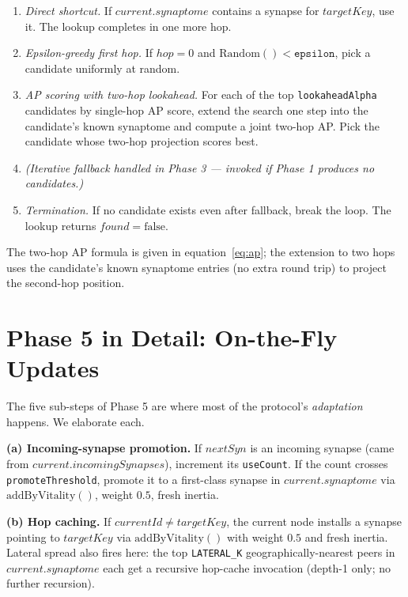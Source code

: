 \documentclass[twoside,nobib]{tufte-book}
\begin{document}
\begin{enumerate}\setlength\itemsep{0.15em}
  \item \emph{Direct shortcut.} If
    $\mathit{current}.\mathit{synaptome}$ contains a synapse for
    $\mathit{targetKey}$, use it. The lookup completes in one more
    hop.
  \item \emph{Epsilon-greedy first hop.} If $\mathit{hop} = 0$ and
    $\mathrm{Random}() < \texttt{epsilon}$, pick a candidate
    uniformly at random.
  \item \emph{AP scoring with two-hop lookahead.} For each of the
    top \texttt{lookaheadAlpha} candidates by single-hop AP score,
    extend the search one step into the candidate's known
    synaptome and compute a joint two-hop AP. Pick the candidate
    whose two-hop projection scores best.
  \item \emph{(Iterative fallback handled in Phase 3 ---
    invoked if Phase 1 produces no candidates.)}
  \item \emph{Termination.} If no candidate exists even after
    fallback, break the loop. The lookup returns
    $\mathit{found} = \mathrm{false}$.
\end{enumerate}

The two-hop AP formula is given in equation~\ref{eq:ap}; the
extension to two hops uses the candidate's known synaptome
entries (no extra round trip) to project the second-hop position.

\section{Phase 5 in Detail: On-the-Fly Updates}

The five sub-steps of Phase 5 are where most of the protocol's
\emph{adaptation} happens. We elaborate each.

\textbf{(a) Incoming-synapse promotion.} If $\mathit{nextSyn}$ is
an incoming synapse (came from
$\mathit{current}.\mathit{incomingSynapses}$), increment its
\texttt{useCount}. If the count crosses
\texttt{promoteThreshold}, promote it to a first-class synapse
in $\mathit{current}.\mathit{synaptome}$ via
$\mathrm{addByVitality}()$, weight $0.5$, fresh inertia.

\textbf{(b) Hop caching.} If $\mathit{currentId} \neq
\mathit{targetKey}$, the current node installs a synapse pointing
to $\mathit{targetKey}$ via $\mathrm{addByVitality}()$ with
weight $0.5$ and fresh inertia. Lateral spread also fires here:
the top \texttt{LATERAL\_K} geographically-nearest peers in
$\mathit{current}.\mathit{synaptome}$ each get a recursive
hop-cache invocation (depth-1 only; no further recursion).
\end{document}
